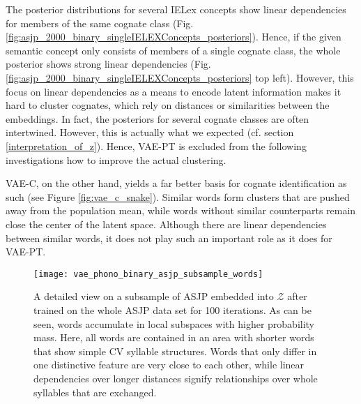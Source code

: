 \documentclass[6pt]{article}
\begin{document}
The posterior distributions for several IELex concepts show linear dependencies for members of the same cognate class (Fig. \ref{fig:asjp_2000_binary_singleIELEXConcepts_posteriors}). Hence, if the given semantic concept only consists of members of a single cognate class, the whole posterior shows strong linear dependencies (Fig. \ref{fig:asjp_2000_binary_singleIELEXConcepts_posteriors} top left). However, this focus on linear dependencies as a means to encode latent information makes it hard to cluster cognates, which rely on distances or similarities between the embeddings. In fact, the posteriors for several cognate classes are often intertwined. However, this is actually what we expected (cf. section \ref{interpretation_of_z}). Hence, VAE-PT is excluded from the following investigations how to improve the actual clustering.


VAE-C, on the other hand, yields a far better basis for cognate identification as such (see Figure \ref{fig:vae_c_snake}). Similar words form clusters that are pushed away from the population mean, while words without similar counterparts remain close the center of the latent space. Although there are linear dependencies between similar words, it does not play such an important role as it does for VAE-PT.  
\begin{figure}[h!] %
   \centering
   \texttt{[image: vae\_phono\_binary\_asjp\_subsample\_words]} 
   \caption{A detailed view on a subsample of ASJP embedded into $\mathcal{Z}$ after trained on the whole ASJP data set for 100 iterations. As can be seen, words accumulate in local subspaces with higher probability mass. Here, all words are contained in an area with shorter words that show simple CV syllable structures. Words that only differ in one distinctive feature are very close to each other, while linear dependencies over longer distances signify relationships over whole syllables that are exchanged.}
   \label{fig:vae_phono_binary_asjp_subsample_words}
\end{figure}
\end{document}
